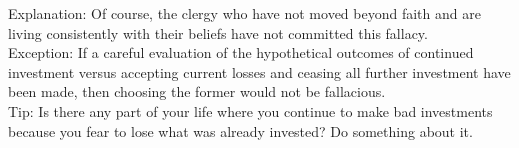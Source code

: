 \documentclass[a4paper,12pt,single,pdftex]{scrartcl}
\begin{document}
{    
      Explanation: Of course, the clergy who have not moved beyond faith and are living consistently with their beliefs have not committed this fallacy.
    \\

    
      Exception: If a careful evaluation of the hypothetical outcomes of continued investment versus accepting current losses and ceasing all further investment have been made, then choosing the former would not be fallacious.
    \\

    
      Tip: Is there any part of your life where you continue to make bad investments because you fear to lose what was already invested? Do something about it.
    \\

    
      
    \\

  }
\end{document}
